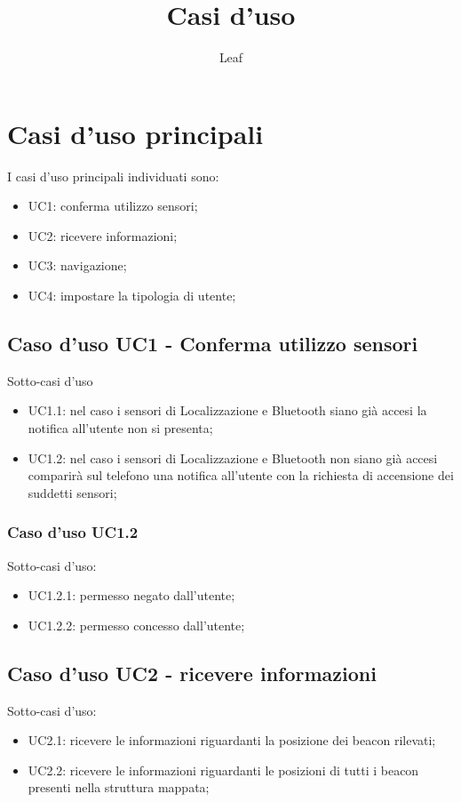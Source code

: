 \documentclass{article}
\begin{document}
\title{Casi d'uso}
\author{Leaf}
\maketitle
\section{Casi d'uso principali}
	I casi d'uso principali individuati sono:
	\begin{itemize}
		\item UC1: conferma utilizzo sensori;
		\item UC2: ricevere informazioni;
		\item UC3: navigazione;
		\item UC4: impostare la tipologia di utente;
	\end{itemize}
	
	\subsection{Caso d'uso UC1 - Conferma utilizzo sensori}
	Sotto-casi d'uso
	\begin{itemize}
		\item UC1.1: nel caso i sensori di Localizzazione e Bluetooth siano già accesi la notifica all'utente non si presenta;
		\item UC1.2: nel caso i sensori di Localizzazione e Bluetooth non siano già accesi comparirà sul telefono una notifica all'utente con la richiesta di accensione dei suddetti sensori;
	\end{itemize}
	
	\subsubsection{Caso d'uso UC1.2}
	Sotto-casi d'uso:
	\begin{itemize}
		\item UC1.2.1: permesso negato dall'utente;
		\item UC1.2.2: permesso concesso dall'utente;
	\end{itemize}
	
	\subsection{Caso d'uso UC2 - ricevere informazioni}
	Sotto-casi d'uso:
	\begin{itemize}
		\item UC2.1: ricevere le informazioni riguardanti la posizione dei beacon rilevati;
		\item UC2.2: ricevere le informazioni riguardanti le posizioni di tutti i beacon presenti nella struttura mappata;
	\end{itemize}
	
\end{document}
